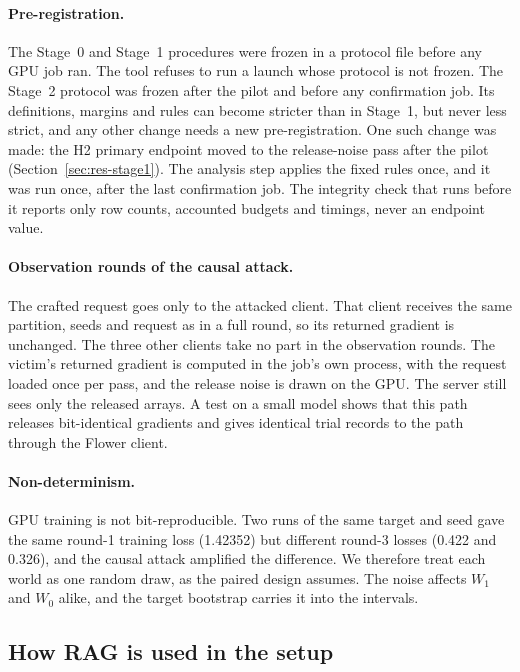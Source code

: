 \documentclass[11pt]{article}
\begin{document}
\paragraph{Pre-registration.} The Stage~0 and Stage~1 procedures were frozen in a protocol file before any GPU job ran. The tool refuses to run a launch whose protocol is not frozen. The Stage~2 protocol was frozen after the pilot and before any confirmation job. Its definitions, margins and rules can become stricter than in Stage~1, but never less strict, and any other change needs a new pre-registration. One such change was made: the H2 primary endpoint moved to the release-noise pass after the pilot (Section~\ref{sec:res-stage1}). The analysis step applies the fixed rules once, and it was run once, after the last confirmation job. The integrity check that runs before it reports only row counts, accounted budgets and timings, never an endpoint value.

\paragraph{Observation rounds of the causal attack.} The crafted request goes only to the attacked client. That client receives the same partition, seeds and request as in a full round, so its returned gradient is unchanged. The three other clients take no part in the observation rounds. The victim's returned gradient is computed in the job's own process, with the request loaded once per pass, and the release noise is drawn on the GPU. The server still sees only the released arrays. A test on a small model shows that this path releases bit-identical gradients and gives identical trial records to the path through the Flower client.

\paragraph{Non-determinism.} GPU training is not bit-reproducible. Two runs of the same target and seed gave the same round-1 training loss (1.42352) but different round-3 losses (0.422 and 0.326), and the causal attack amplified the difference. We therefore treat each world as one random draw, as the paired design assumes. The noise affects $W_1$ and $W_0$ alike, and the target bootstrap carries it into the intervals.

\subsection{How RAG is used in the setup}\label{sec:rag-setup}
\end{document}
